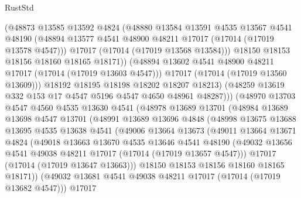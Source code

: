 \begin{lexlean}{RustStd}
\begin{coremodule}
                    (@48873
                      @13585
                      @13592
                      @4824
                      (@48880
                        @13584
                        @13591
                        @4535
                        @13567
                        @4541
                        @48190
                        (@48894 @13577 @4541 @48900 @48211 @17017 (@17014 (@17019 @13578 @4547)))
                        @17017
                        (@17014 (@17019 @13568 @13584)))
                      @18150
                      @18153
                      @18156
                      @18160
                      @18165
                      @18171))
                  (@48894 @13602 @4541 @48900 @48211 @17017 (@17014 (@17019 @13603 @4547)))
                  @17017
                  (@17014 (@17019 @13560 @13609)))
                @18192
                @18195
                @18198
                @18202
                @18207
                @18213)
              (@48259 @13619 @332 @153 @17 @4547 @5196 @4547 @4650 @48961 @48287)))
          (@48970
            @13703
            @4547
            @4560
            @4535
            @13630
            @4541
            (@48978
              @13689
              @13701
              (@48984
                @13689
                @13698
                @4547
                @13701
                (@48991
                  @13689
                  @13696
                  @4848
                  (@48998
                    @13675
                    @13688
                    @13695
                    @4535
                    @13638
                    @4541
                    (@49006
                      @13664
                      @13673
                      (@49011
                        @13664
                        @13671
                        @4824
                        (@49018
                          @13663
                          @13670
                          @4535
                          @13646
                          @4541
                          @48190
                          (@49032 @13656 @4541 @49038 @48211 @17017 (@17014 (@17019 @13657 @4547)))
                          @17017
                          (@17014 (@17019 @13647 @13663)))
                        @18150
                        @18153
                        @18156
                        @18160
                        @18165
                        @18171))
                    (@49032 @13681 @4541 @49038 @48211 @17017 (@17014 (@17019 @13682 @4547)))
                    @17017

\end{coremodule}
\end{lexlean}
